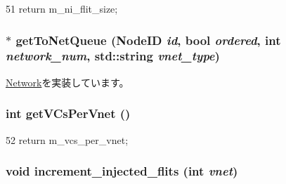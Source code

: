 \begin{DoxyCode}
51 {return m_ni_flit_size; }
\end{DoxyCode}
\hypertarget{classBaseGarnetNetwork_a19d1e55629eb66ec0e248558198f327a}{
\subsubsection[{getToNetQueue}]{$\ast$ getToNetQueue ({\bf NodeID} {\em id}, \/  bool {\em ordered}, \/  int {\em network\_\-num}, \/  std::string {\em vnet\_\-type})}}
\label{classBaseGarnetNetwork_a19d1e55629eb66ec0e248558198f327a}


\hyperlink{classNetwork_aeb27c17e088f115f8b5e3366c9ef8415}{Network}を実装しています。\hypertarget{classBaseGarnetNetwork_a08e15022aa1b80764b8f355c5bfe01f9}{
\subsubsection[{getVCsPerVnet}]{\setlength{\rightskip}{0pt plus 5cm}int getVCsPerVnet ()}}
\label{classBaseGarnetNetwork_a08e15022aa1b80764b8f355c5bfe01f9}



\begin{DoxyCode}
52 {return m_vcs_per_vnet; }
\end{DoxyCode}
\hypertarget{classBaseGarnetNetwork_a0bc8941f77cccd0dfbf786e6a09c8861}{
\subsubsection[{increment\_\-injected\_\-flits}]{\setlength{\rightskip}{0pt plus 5cm}void increment\_\-injected\_\-flits (int {\em vnet})}}
\label{classBaseGarnetNetwork_a0bc8941f77cccd0dfbf786e6a09c8861}



